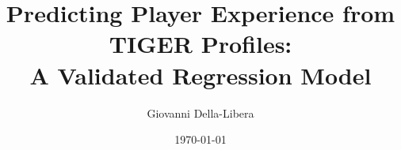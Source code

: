 \documentclass{article}
\title{Predicting Player Experience from TIGER Profiles:\\
A Validated Regression Model}
\author{Giovanni Della-Libera}
\date{\today}
\begin{document}
\maketitle

\begin{abstract}

\end{abstract}










\end{document}
